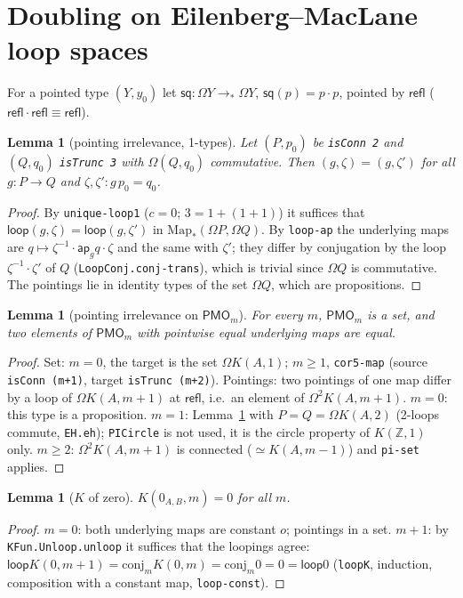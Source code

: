 \documentclass[11pt]{amsart}
\newtheorem{lemma}[theorem]{Lemma}
\theoremstyle{definition}
\theoremstyle{remark}
\newcommand{\Om}{\Omega}
\newcommand{\Map}{\mathrm{Map}_*}
\newcommand{\Z}{\mathbb{Z}}
\newcommand{\code}[1]{\texttt{#1}}
\newcommand{\refl}{\mathsf{refl}}
\newcommand{\lp}{\mathsf{loop}}
\newcommand{\PMO}{\mathsf{PMO}}
\newcommand{\sq}{\mathsf{sq}}
\begin{document}
\section{Doubling on Eilenberg--MacLane loop spaces}

For a pointed type $(Y,y_0)$ let $\sq:\Om Y\to_*\Om Y$, $\sq(p)=p\cdot p$,
pointed by $\refl$ ($\refl\cdot\refl\equiv\refl$).

\begin{lemma}[pointing irrelevance, 1-types]\label{l:pi1}
Let $(P,p_0)$ be \code{isConn 2} and $(Q,q_0)$ \code{isTrunc 3} with
$\Om(Q,q_0)$ commutative. Then $(g,\zeta)=(g,\zeta')$ for all $g:P\to Q$
and $\zeta,\zeta':g\,p_0=q_0$.
\end{lemma}
\begin{proof}
By \code{unique-loop1} ($c=0$; $3=1+(1+1)$) it suffices that
$\lp(g,\zeta)=\lp(g,\zeta')$ in $\Map(\Om P,\Om Q)$. By \code{loop-ap} the
underlying maps are $q\mapsto\zeta^{-1}\cdot\mathsf{ap}_gq\cdot\zeta$ and the
same with $\zeta'$; they differ by conjugation by the loop
$\zeta^{-1}\cdot\zeta'$ of $Q$ (\code{LoopConj.conj-trans}), which is trivial
since $\Om Q$ is commutative. The pointings lie in identity types of the
set $\Om Q$, which are propositions.
\end{proof}

\begin{lemma}[pointing irrelevance on $\PMO_m$]\label{l:pmo-pi}
For every $m$, $\PMO_m$ is a set, and two elements of $\PMO_m$ with
pointwise equal underlying maps are equal.
\end{lemma}
\begin{proof}
Set: $m=0$, the target is the set $\Om K(A,1)$; $m\ge1$, \code{cor5-map}
(source \code{isConn (m+1)}, target \code{isTrunc (m+2)}). Pointings: two
pointings of one map differ by a loop of $\Om K(A,m{+}1)$ at $\refl$,
i.e.\ an element of $\Om^2K(A,m{+}1)$. $m=0$: this type is a proposition.
$m=1$: Lemma~\ref{l:pi1} with $P=Q=\Om K(A,2)$ (2-loops commute,
\code{EH.eh}); \code{PICircle} is not used, it is the circle property of
$K(\Z,1)$ only. $m\ge2$: $\Om^2K(A,m{+}1)$ is connected
($\simeq K(A,m{-}1)$) and \code{pi-set} applies.
\end{proof}

\begin{lemma}[$K$ of zero]\label{l:K0}
$K(0_{A,B},m)=0$ for all $m$.
\end{lemma}
\begin{proof}
$m=0$: both underlying maps are constant $o$; pointings in a set.
$m+1$: by \code{KFun.Unloop.unloop} it suffices that the loopings agree:
$\lp K(0,m{+}1)=\mathrm{conj}_m K(0,m)=\mathrm{conj}_m 0=0=\lp 0$
(\code{loopK}, induction, composition with a constant map, \code{loop-const}).
\end{proof}
\end{document}
